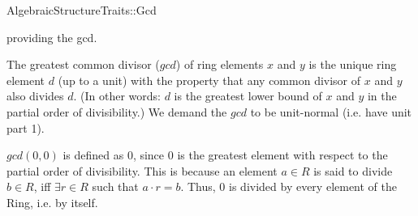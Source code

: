 \begin{ccRefConcept}{AlgebraicStructureTraits::Gcd}

\ccDefinition

 providing the gcd. 

The greatest common divisor ($gcd$) of ring elements $x$ and $y$ is the unique 
ring element $d$ (up to a unit) with the property that any common divisor of 
$x$ and $y$ also divides $d$. (In other words: $d$ is the greatest lower bound 
of $x$ and $y$ in the partial order of divisibility.) We demand the $gcd$ to be 
unit-normal (i.e. have unit part 1). 

$gcd(0,0)$ is defined as $0$, since $0$ is the greatest element with respect 
to the partial order of divisibility. This is because an element $a \in R$ is said to divide $b \in R$, iff $\exists r \in R$ such that $a \cdot r = b$. 
Thus, $0$ is divided by every element of the Ring, i.e. by itself. 

\ccRefines 


\ccTypes

\ccGlue
{}\ccGlue
{}

\ccOperations
{}


\ccSeeAlso


\end{ccRefConcept} 
